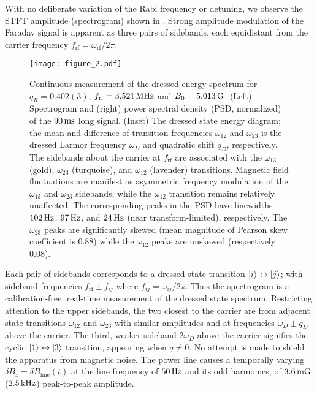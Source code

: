 \documentclass[aps,prl,reprint,superscriptaddress,floatfix]{revtex4-1}
\begin{document}
With no deliberate variation of the Rabi frequency or detuning, we observe the STFT amplitude (spectrogram) shown in .
Strong amplitude modulation of the Faraday signal is apparent as three pairs of sidebands, each equidistant from the carrier frequency $f_{\text{rf}} = \omega_{\text{rf}}/2\pi$. 
\begin{figure}
    \texttt{[image: figure\_2.pdf]}
    \caption{
    \label{fig:static_coupling}
    Continuous measurement of the dressed energy spectrum for $q_R = 0.402(3)$, $f_{\text{rf}}=\unit[3.521]{MHz}$ and $B_0=\unit[5.013]{G}$.
    (Left) Spectrogram and (right) power spectral density (PSD, normalized) of the $\unit[90]{ms}$ long signal. 
    (Inset) The dressed state energy diagram; the mean and difference of transition frequencies $\omega_{12}$ and $\omega_{23}$ is the dressed Larmor frequency $\omega_D$ and quadratic shift $q_D$, respectively.
    The sidebands about the carrier at $f_{\text{rf}}$ are associated with the $\omega_{13}$ (gold), $\omega_{23}$ (turquoise), and $\omega_{12}$ (lavender) transitions.
    Magnetic field fluctuations are manifest as asymmetric frequency modulation of the $\omega_{13}$ and $\omega_{23}$ sidebands, while the $\omega_{12}$ transition remains relatively unaffected.
    The corresponding peaks in the PSD have linewidths $\unit[102]{Hz}$, $\unit[97]{Hz}$, and $\unit[24]{Hz}$ (near transform-limited), respectively.
    The $\omega_{23}$ peaks are significantly skewed (mean magnitude of Pearson skew coefficient is $0.88$) while the $\omega_{12}$ peaks are unskewed (respectively $0.08$).
    }
\end{figure}
Each pair of sidebands corresponds to a dressed state transition $\vert i \rangle  \leftrightarrow \vert j \rangle $; with sideband frequencies  $f_{\text{rf}} \pm f_{ij}$ where $f_{ij} = \omega_{ij}/2\pi$.
Thus the spectrogram is a calibration-free, real-time measurement of the dressed state spectrum.
Restricting attention to the upper sidebands, the two closest to the carrier are from adjacent state transitions $\omega_{12}$ and $\omega_{23}$ with similar amplitudes and at frequencies $\omega_D \pm q_D$ above the carrier.
The third, weaker sideband $2\omega_D$ above the carrier signifies the cyclic $\vert 1 \rangle  \leftrightarrow \vert 3 \rangle $ transition, appearing when $q\neq 0$. 
No attempt is made to shield the apparatus from magnetic noise.
The power line causes a temporally varying $\delta B_z = \delta B_{\text{line}}(t)$ at the line frequency of $\unit[50]{Hz}$ and its odd harmonics, of $\unit[3.6]{mG}$ ($\unit[2.5]{kHz}$) peak-to-peak amplitude.
\end{document}
